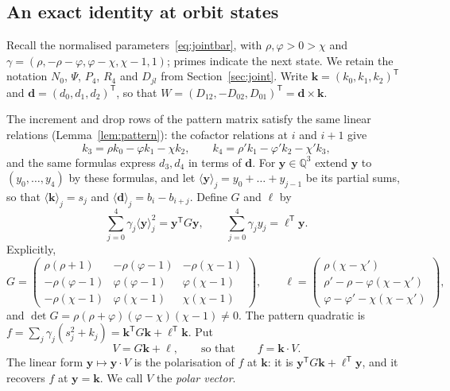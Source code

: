 \documentclass[11pt]{article}
\theoremstyle{definition}
\theoremstyle{remark}
\begin{document}
\subsection{An exact identity at orbit states}

Recall the normalised parameters~\eqref{eq:jointbar}, with $\rho,\varphi>0>\chi$ and
$\gamma=(\rho,-\rho-\varphi,\varphi-\chi,\chi-1,1)$; primes indicate the next state.
We retain the notation $N_0$, $\Psi$, $P_4$, $R_4$ and $D_{jl}$ from
Section~\ref{sec:joint}. Write $\mathbf k=(k_0,k_1,k_2)^{\mathsf T}$ and
$\mathbf d=(d_0,d_1,d_2)^{\mathsf T}$, so that
$W=(D_{12},-D_{02},D_{01})^{\mathsf T}=\mathbf d\times\mathbf k$.

The increment and drop rows of the pattern matrix satisfy the same linear relations
(Lemma~\ref{lem:pattern}): the cofactor relations at $i$ and $i+1$ give
\[
 k_3=\rho k_0-\varphi k_1-\chi k_2,\qquad k_4=\rho'k_1-\varphi'k_2-\chi'k_3,
\]
and the same formulas express $d_3,d_4$ in terms of $\mathbf d$. For
$\mathbf y\in\mathbb Q^3$ extend $\mathbf y$ to $(y_0,\dots,y_4)$ by these formulas,
and let $\langle\mathbf y\rangle_j=y_0+\dots+y_{j-1}$ be its partial sums, so that
$\langle\mathbf k\rangle_j=s_j$ and $\langle\mathbf d\rangle_j=b_i-b_{i+j}$. Define $G$ and $\ell$ by
\[
 \sum_{j=0}^4\gamma_j\langle\mathbf y\rangle_j^2=\mathbf y^{\mathsf T}G\mathbf y,\qquad
 \sum_{j=0}^4\gamma_jy_j=\ell^{\mathsf T}\mathbf y.
\]
Explicitly,
\[
 G=\begin{pmatrix}
 \rho(\rho+1)&-\rho(\varphi-1)&-\rho(\chi-1)\\
 -\rho(\varphi-1)&\varphi(\varphi-1)&\varphi(\chi-1)\\
 -\rho(\chi-1)&\varphi(\chi-1)&\chi(\chi-1)
 \end{pmatrix},\qquad
 \ell=\begin{pmatrix}
 \rho(\chi-\chi')\\ \rho'-\rho-\varphi(\chi-\chi')\\ \varphi-\varphi'-\chi(\chi-\chi')
 \end{pmatrix},
\]
and $\det G=\rho(\rho+\varphi)(\varphi-\chi)(\chi-1)\ne0$. The pattern
quadratic is $f=\sum_j\gamma_j(s_j^2+k_j)=\mathbf k^{\mathsf T}G\mathbf k+\ell^{\mathsf T}\mathbf k$.
Put
\[
 V=G\mathbf k+\ell,\qquad\text{so that}\qquad f=\mathbf k\cdot V.
\]
The linear form $\mathbf y\mapsto\mathbf y\cdot V$ is the polarisation of $f$
at $\mathbf k$: it is $\mathbf y^{\mathsf T}G\mathbf k+\ell^{\mathsf T}\mathbf y$,
and it recovers $f$ at $\mathbf y=\mathbf k$. We call $V$ the \emph{polar vector}.
\end{document}
